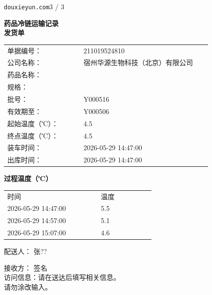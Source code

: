 \documentclass[UTF8,10pt,a4paper,fontset=fandol]{ctexart}
\newcommand{\fieldvalue}[1]{#1}
\newcommand{\handwritten}[1]{#1}
\begin{document}
\noindent\texttt{douxieyun.com}\hfill 3 / 3

\newpage

\noindent
\begin{minipage}[t]{0.47\linewidth}
\centering
\textbf{药品冷链运输记录}\\
\textbf{发货单}

\medskip
\noindent
\scriptsize
\begin{tabular}{@{}p{0.34\linewidth}p{0.58\linewidth}@{}}
单据编号：&
\fieldvalue{211019524810}\\
公司名称：&
\fieldvalue{宿州华源生物科技（北京）有限公司}\\
药品名称：&
\fieldvalue{\text{（字迹模糊）}}\\
规格：&
\fieldvalue{\text{（字迹模糊）}}\\
批号：&
\fieldvalue{Y000516}\\
有效期至：&
\fieldvalue{Y000506}\\
起始温度（℃）：&
\fieldvalue{4.5}\\
终点温度（℃）：&
\fieldvalue{4.5}\\
装车时间：&
\fieldvalue{2026-05-29 14:47:00}\\
出库时间：&
\fieldvalue{2026-05-29 14:47:00}\\
\end{tabular}

\medskip
\textbf{过程温度（℃）}

\begin{tabular}{@{}p{0.38\linewidth}p{0.22\linewidth}@{}}
时间&温度\\
2026-05-29 14:47:00&
\fieldvalue{5.5}\\
2026-05-29 14:57:00&
\fieldvalue{5.1}\\
2026-05-29 15:07:00&
\fieldvalue{4.6}\\
\end{tabular}

\medskip
配送人：%
\fieldvalue{\handwritten{张??}}

\medskip
接收方：%
\fieldvalue{\handwritten{签名}}\\[1ex]

访问信息：请在送达后填写相关信息。\\
请勿涂改输入。
\end{minipage}
\end{document}
